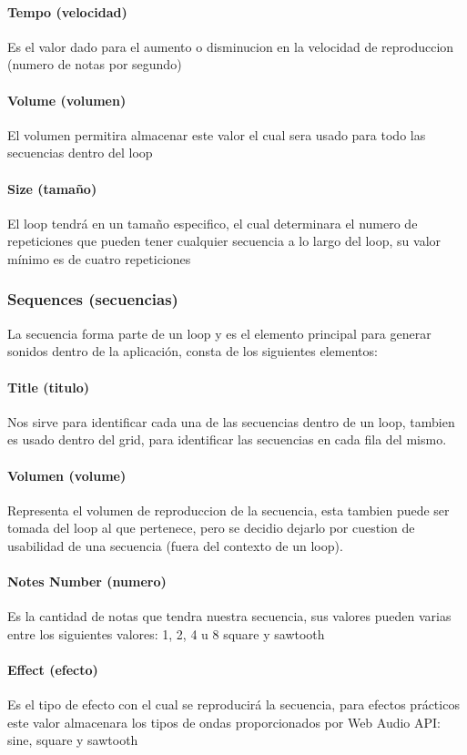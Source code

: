 \paragraph{Tempo (velocidad)}
Es el valor dado para el aumento o disminucion en la velocidad de reproduccion
(numero de notas por segundo)
\paragraph{Volume (volumen)}
El volumen permitira almacenar este valor el cual sera usado para todo las
secuencias dentro del loop
\paragraph{Size (tamaño)}
El loop tendrá en un tamaño especifico, el cual determinara el numero de repeticiones
que pueden tener cualquier secuencia a lo largo del loop, su valor mínimo
es de cuatro repeticiones

\subsubsection{Sequences (secuencias)}
La secuencia forma parte de un loop y es el elemento principal para generar sonidos
dentro de la aplicación, consta de los siguientes elementos:
\paragraph{Title (titulo)}
Nos sirve para identificar cada una de las secuencias dentro de un loop, tambien
es usado dentro del grid, para identificar las secuencias en cada fila del mismo.
\paragraph{Volumen (volume)}
Representa el volumen de reproduccion de la secuencia, esta tambien puede ser tomada
del loop al que pertenece, pero se decidio dejarlo por cuestion de usabilidad de
una secuencia (fuera del contexto de un loop).
\paragraph{Notes Number (numero)}
Es la cantidad de notas que tendra nuestra secuencia, sus valores pueden varias entre los
siguientes valores: 1, 2, 4 u 8
square y sawtooth
\paragraph{Effect (efecto)}
Es el tipo de efecto con el cual se reproducirá la secuencia, para efectos prácticos
este valor almacenara los tipos de ondas proporcionados por Web Audio API: sine,
square y sawtooth

